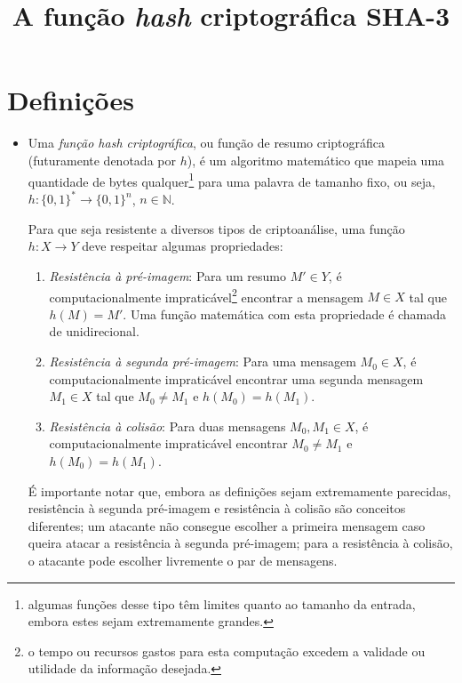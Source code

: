 \documentclass{article}
\title{\vspace{-1.5cm}
    \Large{\textbf{
        A função \emph{hash} criptográfica SHA-3
    }}\vspace{-1.5cm}
}
\author{}
\date{}
\begin{document}
\maketitle

\thispagestyle{firststyle}

\section{Definições}

\begin{itemize}

\item Uma \emph{função hash criptográfica}, ou função de resumo criptográfica
(futuramente denotada por $h$), é um algoritmo matemático que mapeia uma
quantidade de bytes qualquer\footnote{algumas funções desse tipo têm
limites quanto ao tamanho da entrada, embora estes sejam extremamente
grandes.} para uma palavra de tamanho fixo, ou seja,
$h : \{0, 1\}^{*} \longrightarrow \{0, 1\}^{n}$, $n \in \mathbb{N}$.

Para que seja resistente a diversos tipos de criptoanálise, uma função
$h : X \longrightarrow Y$ deve respeitar algumas propriedades:

\begin{enumerate}[label=\roman*.]

\item \emph{Resistência à pré-imagem}: Para um resumo $M' \in Y$, é
computacionalmente impraticável\footnote{o tempo ou recursos gastos para esta
computação excedem a validade ou utilidade da informação desejada.} encontrar
a mensagem $M \in X$ tal que $h(M) = M'$. Uma função matemática com esta
propriedade é chamada de unidirecional.

\item \emph{Resistência à segunda pré-imagem}: Para uma mensagem $M_0 \in X$,
é computacionalmente impraticável encontrar uma segunda mensagem $M_1 \in X$
tal que $M_0 \neq M_1$ e $h(M_0) = h(M_1)$.

\item \emph{Resistência à colisão}: Para duas mensagens $M_0, M_1 \in X$, é
computacionalmente impraticável encontrar $M_0 \neq M_1$ e $h(M_0) = h(M_1)$.

\end{enumerate}

É importante notar que, embora as definições sejam extremamente parecidas,
resistência à segunda pré-imagem e resistência à colisão são conceitos
diferentes; um atacante não consegue escolher a primeira mensagem caso queira
atacar a resistência à segunda pré-imagem; para a resistência à colisão, o
atacante pode escolher livremente o par de mensagens.


\end{itemize}
\end{document}
